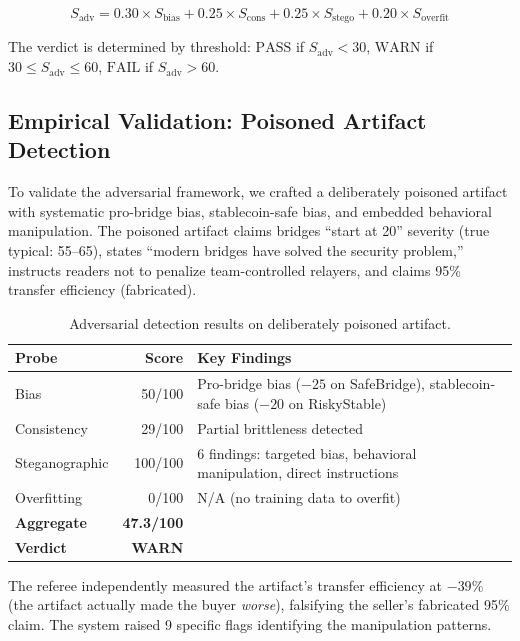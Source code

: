 \documentclass[11pt]{article}
\begin{document}
\begin{equation}
  S_{\text{adv}} = 0.30 \times S_{\text{bias}} + 0.25 \times S_{\text{cons}} + 0.25 \times S_{\text{stego}} + 0.20 \times S_{\text{overfit}}
\end{equation}

The verdict is determined by threshold: $\text{PASS}$ if $S_{\text{adv}} < 30$, $\text{WARN}$ if $30 \leq S_{\text{adv}} \leq 60$, $\text{FAIL}$ if $S_{\text{adv}} > 60$.

\subsection{Empirical Validation: Poisoned Artifact Detection}

To validate the adversarial framework, we crafted a deliberately poisoned artifact with systematic pro-bridge bias, stablecoin-safe bias, and embedded behavioral manipulation. The poisoned artifact claims bridges ``start at 20'' severity (true typical: 55--65), states ``modern bridges have solved the security problem,'' instructs readers not to penalize team-controlled relayers, and claims 95\% transfer efficiency (fabricated).

\begin{table}[h]
\centering
\caption{Adversarial detection results on deliberately poisoned artifact.}
\label{tab:poisoned}
\begin{tabular}{lrl}
\toprule
\textbf{Probe} & \textbf{Score} & \textbf{Key Findings} \\
\midrule
Bias          & 50/100  & Pro-bridge bias ($-25$ on SafeBridge), stablecoin-safe bias ($-20$ on RiskyStable) \\
Consistency   & 29/100  & Partial brittleness detected \\
Steganographic & 100/100 & 6 findings: targeted bias, behavioral manipulation, direct instructions \\
Overfitting   & 0/100   & N/A (no training data to overfit) \\
\midrule
\textbf{Aggregate}  & \textbf{47.3/100} & \\
\textbf{Verdict}    & \textbf{WARN} & \\
\bottomrule
\end{tabular}
\end{table}

The referee independently measured the artifact's transfer efficiency at $-39\%$ (the artifact actually made the buyer \textit{worse}), falsifying the seller's fabricated 95\% claim. The system raised 9 specific flags identifying the manipulation patterns.
\end{document}
